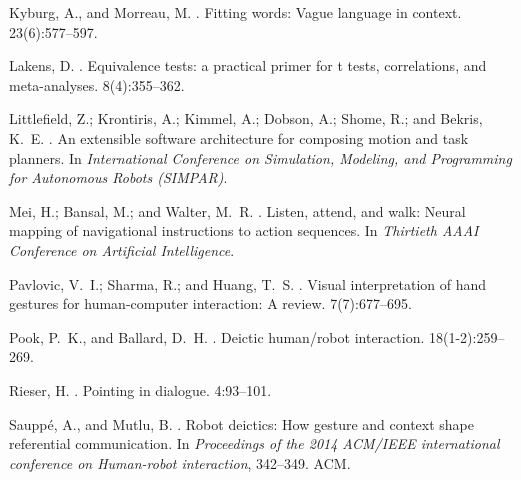 \documentclass[letterpaper]{article} %
\begin{document}
\begin{thebibliography}{}
Kyburg, A., and Morreau, M.
.
\newblock Fitting words: Vague language in context.
 23(6):577--597.

Lakens, D.
.
\newblock Equivalence tests: a practical primer for t tests, correlations, and
  meta-analyses.
 8(4):355--362.

Littlefield, Z.; Krontiris, A.; Kimmel, A.; Dobson, A.; Shome, R.; and Bekris,
  K.~E.
.
\newblock An extensible software architecture for composing motion and task
  planners.
\newblock In {\em {International Conference on Simulation, Modeling, and
  Programming for Autonomous Robots (SIMPAR)}}.

Mei, H.; Bansal, M.; and Walter, M.~R.
.
\newblock Listen, attend, and walk: Neural mapping of navigational instructions
  to action sequences.
\newblock In {\em Thirtieth AAAI Conference on Artificial Intelligence}.

Pavlovic, V.~I.; Sharma, R.; and Huang, T.~S.
.
\newblock Visual interpretation of hand gestures for human-computer
  interaction: A review.
  7(7):677--695.

Pook, P.~K., and Ballard, D.~H.
.
\newblock Deictic human/robot interaction.
 18(1-2):259--269.

Rieser, H.
.
\newblock Pointing in dialogue.
 4:93--101.

Saupp{\'e}, A., and Mutlu, B.
.
\newblock Robot deictics: How gesture and context shape referential
  communication.
\newblock In {\em Proceedings of the 2014 ACM/IEEE international conference on
  Human-robot interaction},  342--349.
\newblock ACM.


\end{thebibliography}
\end{document}
